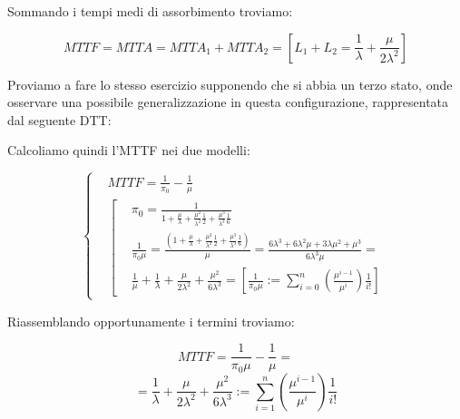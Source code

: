 Sommando i tempi medi di assorbimento troviamo:

\[
	MTTF=MTTA=MTTA_1+MTTA_2=[L_1+L_2=\frac{1}{\lambda}+\frac{\mu}{2\lambda^2}]
\]

Proviamo a fare lo stesso esercizio supponendo che si abbia un terzo stato, onde osservare una possibile generalizzazione in questa configurazione, rappresentata dal seguente DTT:

\begin{center}
\end{center}

Calcoliamo quindi l'MTTF nei due modelli:

\[
	\left\{
	\begin{aligned}
	&MTTF = \frac{1}{\pi_0}-\frac{1}{\mu}\\
	&\left[
	\begin{aligned}
	&\pi_0=\frac{1}{1+\frac{\mu}{\lambda}+\frac{\mu^2}{\lambda^2}\frac{1}{2}+\frac{\mu^3}{\lambda^3}\frac{1}{6}}\\
	&\frac{1}{\pi_0\mu}=\frac{(1+\frac{\mu}{\lambda}+\frac{\mu^2}{\lambda^2}\frac{1}{2}+\frac{\mu^3}{\lambda^3}\frac{1}{6})}{\mu} = \frac{6\lambda^3+6\lambda^2\mu+3\lambda\mu^2+\mu^3}{6\lambda^3\mu}=\\
	&\frac{1}{\mu}+\frac{1}{\lambda}+\frac{\mu}{2\lambda^2}+\frac{\mu^2}{6\lambda^3} = [\frac{1}{\pi_0\mu}:=\sum_{i=0}^n{(\frac{\mu^{i-1}}{\mu^i})\frac{1}{i!}}] 
	\end{aligned}
	\right.
	\end{aligned}
	\right.
\]

Riassemblando opportunamente i termini troviamo: 

\[
	MTTF = \frac{1}{\pi_0\mu}-\frac{1}{\mu} =
\]
\[
	= \frac{1}{\lambda}+\frac{\mu}{2\lambda^2}+\frac{\mu^2}{6\lambda^3} := \sum_{i=1}^n{(\frac{\mu^{i-1}}{\mu^i})\frac{1}{i!}}
\]

